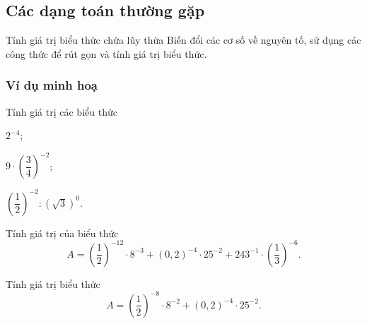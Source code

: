 \subsection{Các dạng toán thường gặp}
\begin{dang}{Tính giá trị biểu thức chứa lũy thừa}
	Biến đổi các cơ số về nguyên tố, sử dụng các công thức để rút gọn và tính giá trị biểu thức.
\end{dang}
\subsubsection{Ví dụ minh hoạ}
\begin{vd} 
	Tính giá trị các biểu thức
	\begin{listEX}[3]
		\item $2^{-4}$;
		\item $9\cdot \left(\dfrac{3}{4}\right)^{-2}$;
		\item $\left(\dfrac{1}{2}\right)^{-2}:\left(\sqrt{3}\right)^0$.
	\end{listEX}
\end{vd}
\begin{vd} 
	Tính giá trị của biểu thức $$A=\left(\dfrac{1}{2}\right)^{-12}\cdot 8^{-3}+(0{,}2)^{-4}\cdot 25^{-2}+243^{-1}\cdot \left(\dfrac{1}{3}\right)^{-6}.$$
\end{vd}
\begin{vd} 
	Tính giá trị biểu thức $$A=\left(\dfrac{1}{2}\right)^{-8}\cdot 8^{-2}+(0{,}2)^{-4}\cdot 25^{-2}.$$
\end{vd}

